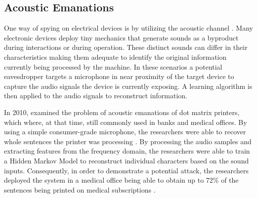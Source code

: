 


\subsection{Acoustic Emanations}
One way of spying on electrical devices is by utilizing the acoustic channel \cite{Backes:2010:ASA:1929820.1929847,1301311,Zhuang:2009:KAE:1609956.1609959}. Many electronic devices deploy tiny mechanics that generate sounds as a byproduct during interactions or during operation. These distinct sounds can differ in their characteristics making them adequate to identify the original information currently being processed by the machine. In these scenarios a potential eavesdropper targets a microphone in near proximity of the target device to capture the audio signals the device is currently exposing. A learning algorithm is then applied to the audio signals to reconstruct information.

In 2010, \citeauthor{Backes:2010:ASA:1929820.1929847} examined the problem of acoustic emanations of dot matrix printers, which where, at that time, still commonly used in banks and medical offices. By using a simple consumer-grade microphone, the researchers were able to recover whole sentences the printer was processing \cite{Backes:2010:ASA:1929820.1929847}. By processing the audio samples and extracting features from the frequency domain, the researchers were able to train a Hidden Markov Model to reconstruct individual characters based on the sound inputs. Consequently, in order to demonstrate a potential attack, the researchers deployed the system in a medical office being able to obtain up to 72\% of the sentences being printed on medical subscriptions \cite{Backes:2010:ASA:1929820.1929847}.

